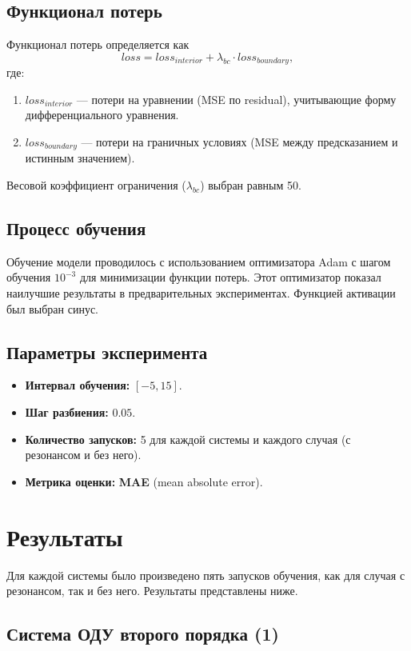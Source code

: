 \documentclass[12pt,a4paper]{article}
\begin{document}
\subsection{Функционал потерь}
Функционал потерь определяется как
\[
loss = loss_{interior} + \lambda_{bc} \cdot loss_{boundary},
\]
где:
\begin{enumerate}
    \item $loss_{interior}$ --- потери на уравнении (MSE по residual), учитывающие форму дифференциального уравнения.
    \item $loss_{boundary}$ --- потери на граничных условиях (MSE между предсказанием и истинным значением).
\end{enumerate}
Весовой коэффициент ограничения ($\lambda_{bc}$) выбран равным 50.

\subsection{Процесс обучения}
Обучение модели проводилось с использованием оптимизатора Adam с шагом обучения $10^{-3}$ для минимизации функции потерь. Этот оптимизатор показал наилучшие результаты в предварительных экспериментах. Функцией активации был выбран синус.

\subsection{Параметры эксперимента}
\begin{itemize}
    \item \textbf{Интервал обучения:} $[-5, 15]$.
    \item \textbf{Шаг разбиения:} $0.05$.
    \item \textbf{Количество запусков:} 5 для каждой системы и каждого случая (с резонансом и без него).
    \item \textbf{Метрика оценки:} \textbf{MAE} (mean absolute error).
\end{itemize}

\section{Результаты}

Для каждой системы было произведено пять запусков обучения, как для случая с резонансом, так и без него. Результаты представлены ниже.

\subsection{Система ОДУ второго порядка (1)}
\end{document}
